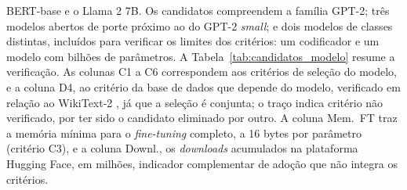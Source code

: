 BERT-base \cite{Devlin2019} e o Llama 2 7B. Os candidatos compreendem a família GPT-2; três
modelos abertos de porte próximo ao do GPT-2 \textit{small}; e dois modelos de classes
distintas, incluídos para verificar os limites dos critérios: um codificador e um modelo com
bilhões de parâmetros. A Tabela~\ref{tab:candidatos_modelo} resume a verificação. As colunas
C1 a C6 correspondem aos critérios de seleção do modelo, e a coluna D4, ao critério da base
de dados que depende do modelo, verificado em relação
ao WikiText-2 \cite{Merity2017}, já que a seleção é conjunta; o traço indica critério não
verificado, por ter sido o candidato eliminado por outro. A coluna Mem.\ FT traz a memória
mínima para o \textit{fine-tuning} completo, a 16 bytes por parâmetro (critério C3), e a
coluna Downl., os \textit{downloads} acumulados na plataforma Hugging Face, em milhões,
indicador complementar de adoção que não integra os critérios.


